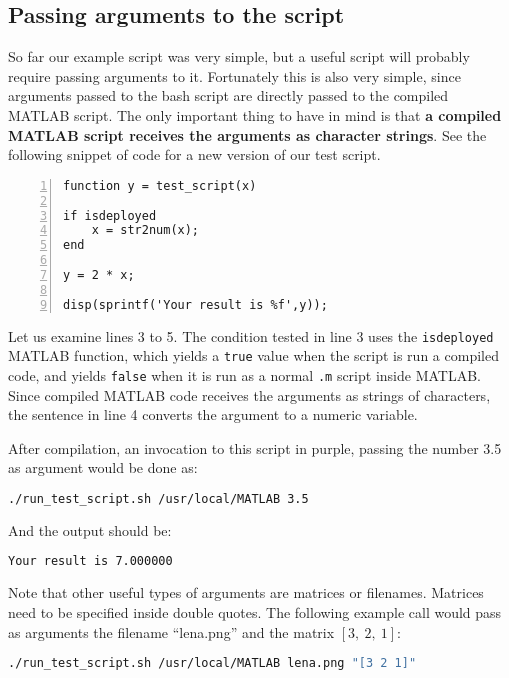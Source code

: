 \subsection{Passing arguments to the script}
So far our example script was very simple, but a useful script will probably
require passing arguments to it. Fortunately this is also very simple, since
arguments passed to the bash script are directly passed to the compiled MATLAB
script. The only important thing to have in mind is that \textbf{a compiled
  MATLAB script receives the arguments as character strings}. See the following
snippet of code for a new version of our test script.

\begin{lstlisting}[numbers=left,title={Second version of \texttt{test\_script.m}},captionpos=b]
function y = test_script(x)

if isdeployed
    x = str2num(x);
end

y = 2 * x;

disp(sprintf('Your result is %f',y));
\end{lstlisting}

Let us examine lines 3 to 5. The condition tested in line 3 uses the
\texttt{isdeployed} MATLAB function, which yields a \texttt{true} value when the
script is run a compiled code, and yields \texttt{false} when it is run as a
normal \texttt{.m} script inside MATLAB. Since compiled MATLAB code receives the
arguments as strings of characters, the sentence in line 4 converts the argument
to a numeric variable.

After compilation, an invocation to this script in purple, passing the number 3.5
as argument would be done as:

\begin{lstlisting}[language=bash]
./run_test_script.sh /usr/local/MATLAB 3.5
\end{lstlisting}

And the output should be:

\begin{lstlisting}[language=bash]
Your result is 7.000000
\end{lstlisting}

Note that other useful types of arguments are matrices or filenames. Matrices
need to be specified inside double quotes. The following example call would pass as arguments the filename ``lena.png'' and the matrix $[3,~2,~1]$:

\begin{lstlisting}[language=bash]
./run_test_script.sh /usr/local/MATLAB lena.png "[3 2 1]" 
\end{lstlisting}


